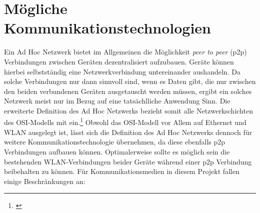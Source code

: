 \section{Mögliche Kommunikationstechnologien}
    Ein Ad Hoc Netzwerk bietet im Allgemeinen die Möglichkeit {\it peer to peer} (p2p) Verbindungen zwischen Geräten dezentralisiert aufzubauen.
    Geräte können hierbei selbstständig eine Netzwerkverbindung untereinander aushandeln. Da solche Verbindungen nur dann sinnvoll sind,
    wenn es Daten gibt, die nur zwischen den beiden verbundenen Geräten ausgetauscht werden müssen, ergibt ein solches Netzwerk meist nur
    im Bezug auf eine tatsächlliche Anwendung Sinn. Die erweiterte Definition des Ad Hoc Netzwerks
    bezieht somit alle Netzwerkschichten des OSI-Modells mit ein.\footnote{\cite[S.23]{Sikora}}
    Obwohl das OSI-Modell vor Allem auf Ethernet und WLAN ausgelegt ist, lässt sich die Definition des Ad Hoc Netzwerks
    dennoch für weitere Kommunikationstechnologie übernehmen, da diese ebenfalls p2p Verbindungen aufbauen können.
    Optimalerweise sollte es möglich sein die bestehenden WLAN-Verbindungen beider Geräte während einer p2p Verbindung beibehalten zu können.
    Für Kommunikationsmedien in diesem Projekt fallen einige Beschränkungen an: 

